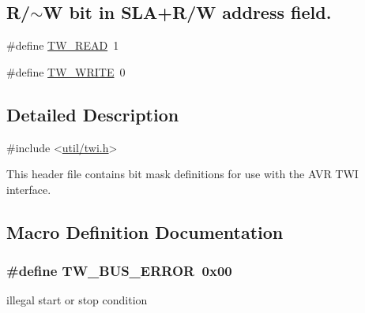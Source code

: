 \subsection*{R/$\sim$W bit in S\+L\+A+\+R/W address field.}
\begin{DoxyCompactItemize}
\item 
\#define \hyperlink{group__util__twi_gaf40f13cadca25e0a83dc096858907819}{T\+W\+\_\+\+R\+E\+AD}~1
\item 
\#define \hyperlink{group__util__twi_gac8a7cb1a91946c6e3955608a91371148}{T\+W\+\_\+\+W\+R\+I\+TE}~0
\end{DoxyCompactItemize}


\subsection{Detailed Description}

\begin{DoxyCode}
\textcolor{preprocessor}{#include <\hyperlink{avr_2include_2util_2twi_8h}{util/twi.h}>} 
\end{DoxyCode}


This header file contains bit mask definitions for use with the A\+VR T\+WI interface. 

\subsection{Macro Definition Documentation}
\subsubsection[{\texorpdfstring{T\+W\+\_\+\+B\+U\+S\+\_\+\+E\+R\+R\+OR}{TW_BUS_ERROR}}]{\setlength{\rightskip}{0pt plus 5cm}\#define T\+W\+\_\+\+B\+U\+S\+\_\+\+E\+R\+R\+OR~0x00}\hypertarget{group__util__twi_ga90d373160b1d0a3f0c454af83c57df71}{}\label{group__util__twi_ga90d373160b1d0a3f0c454af83c57df71}
illegal start or stop condition 
